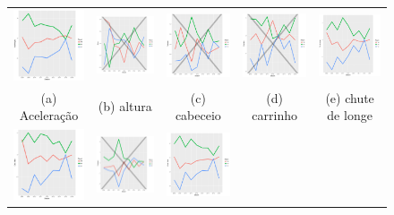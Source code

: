 \documentclass[doc,apacite,oneside,a4paper,12pt]{apa6}
\begin{document}
\begin{figure}
\begin{tabular}{ccccc}
  \includegraphics[width=25mm]{aceleracao_result} & \includegraphics[width=25mm]{altura_result} & \includegraphics[width=25mm]{cabeceio_result} &   \includegraphics[width=25mm]{carrinho_result} &
  \includegraphics[width=25mm]{ch_delonge_result} \\
\scriptsize{(a) Aceleração } & \scriptsize{(b) altura  } & \scriptsize{(c) cabeceio } & \scriptsize{(d) carrinho } & \scriptsize{(e) chute de longe }\\[3pt]
\includegraphics[width=25mm]{cobr_falta_result} & \includegraphics[width=25mm]{combativ__result} &   \includegraphics[width=25mm]{contr_bola_result} &

\end{tabular}
\end{figure}
\end{document}
